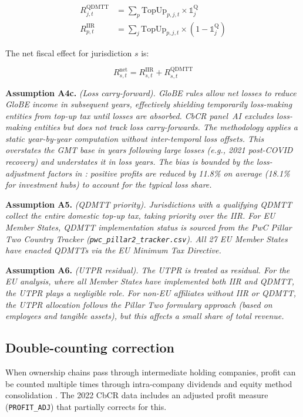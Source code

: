 \documentclass[11pt,a4paper]{article}
\newcommand{\code}[1]{\texttt{#1}}
\newcommand{\assumption}[2]{\noindent\textbf{Assumption #1.} \textit{#2}\medskip}
\begin{document}
\begin{align}
R_{j,t}^{\text{QDMTT}} &= \sum_p \text{TopUp}_{p,j,t} \times \mathbb{1}_j^{\text{Q}} \label{eq:qdmtt} \\
R_{p,t}^{\text{IIR}} &= \sum_j \text{TopUp}_{p,j,t} \times (1 - \mathbb{1}_j^{\text{Q}}) \label{eq:iir}
\end{align}

The net fiscal effect for jurisdiction $s$ is:

\begin{equation}\label{eq:net}
R_{s,t}^{\text{net}} = R_{s,t}^{\text{IIR}} + R_{s,t}^{\text{QDMTT}}
\end{equation}

\assumption{A4c}{(Loss carry-forward). GloBE rules allow net losses to reduce GloBE income in subsequent years, effectively shielding temporarily loss-making entities from top-up tax until losses are absorbed. CbCR panel~AI excludes loss-making entities but does not track loss carry-forwards. The methodology applies a static year-by-year computation without inter-temporal loss offsets. This overstates the GMT base in years following large losses (e.g., 2021 post-COVID recovery) and understates it in loss years. The bias is bounded by the loss-adjustment factors in \citet{hugger2025}: positive profits are reduced by 11.8\% on average (18.1\% for investment hubs) to account for the typical loss share.}

\assumption{A5}{(QDMTT priority). Jurisdictions with a qualifying QDMTT collect the entire domestic top-up tax, taking priority over the IIR. For EU Member States, QDMTT implementation status is sourced from the PwC Pillar Two Country Tracker (\code{pwc\_pillar2\_tracker.csv}). All 27 EU Member States have enacted QDMTTs via the EU Minimum Tax Directive.}

\assumption{A6}{(UTPR residual). The UTPR is treated as residual. For the EU analysis, where all Member States have implemented both IIR and QDMTT, the UTPR plays a negligible role. For non-EU affiliates without IIR or QDMTT, the UTPR allocation follows the Pillar Two formulary approach (based on employees and tangible assets), but this affects a small share of total revenue.}

\subsection{Double-counting correction}\label{sec:doublecounting}

When ownership chains pass through intermediate holding companies, profit can be counted multiple times through intra-company dividends and equity method consolidation \citep{blouin2023}. The 2022 CbCR data includes an adjusted profit measure (\code{PROFIT\_ADJ}) that partially corrects for this.
\end{document}
